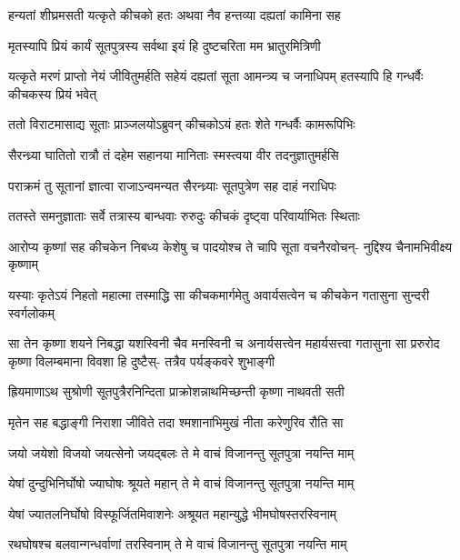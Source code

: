 \twolineshloka
{हन्यतां शीघ्रमसती यत्कृते कीचको हतः}
{अथवा नैव हन्तव्या दह्यतां कामिना सह}


\twolineshloka
{मृतस्यापि प्रियं कार्यं सूतपुत्रस्य सर्वथा}
{इयं हि दुष्टचरिता मम भ्रातुरमित्रिणी}


\threelineshloka
{यत्कृते मरणं प्राप्तो नेयं जीवितुमर्हति}
{सहेयं दह्यतां सूता आमन्त्र्य च जनाधिपम्}
{हतस्यापि हि गन्धर्वैः कीचकस्य प्रियं भवेत्}


\twolineshloka
{ततो विराटमासाद्य सूताः प्राञ्जलयोऽब्रुवन्}
{कीचकोऽयं हतः शेते गन्धर्वैः कामरूपिभिः}


\twolineshloka
{सैरन्ध्र्या घातितो रात्रौ तं दहेम सहानया}
{मानिताः स्मस्त्वया वीर तदनुज्ञातुमर्हसि}


\twolineshloka
{पराक्रमं तु सूतानां ज्ञात्वा राजाऽन्वमन्यत}
{सैरन्ध्र्याः सूतपुत्रेण सह दाहं नराधिपः}


\twolineshloka
{ततस्ते समनुज्ञाताः सर्वे तत्रास्य बान्धवाः}
{रुरुदुः कीचकं दृष्ट्वा परिवार्याभितः स्थिताः}


\fourlineindentedshloka
{आरोप्य कृष्णां सह कीचकेन}
{निबध्य केशेषु च पादयोश्च}
{ते चापि सूता वचनैरवोचन्-}
{नुद्दिश्य चैनामभिवीक्ष्य कृष्णाम्}


\fourlineindentedshloka
{यस्याः कृतेऽयं निहतो महात्मा}
{तस्माद्धि सा कीचकमार्गमेतु}
{अवार्यसत्वेन च कीचकेन}
{गतासुना सुन्दरी स्वर्गलोकम्}


\sixlineindentedshloka
{सा तेन कृष्णा शयने निबद्धा}
{यशस्विनी चैव मनस्विनी च}
{अनार्यसत्त्वेन महार्यसत्त्वा}
{गतासुना सा प्ररुरोद कृष्णा}
{विलम्बमाना विवशा हि दुष्टैस्-}
{तत्रैव पर्यङ्कवरे शुभाङ्गी}


\twolineshloka
{ह्रियमाणाऽथ सुश्रोणी सूतपुत्रैरनिन्दिता}
{प्राक्रोशन्नाथमिच्छन्ती कृष्णा नाथवती सती}


\twolineshloka
{मृतेन सह बद्धाङ्गी निराशा जीविते तदा}
{श्मशानाभिमुखं नीता करेणुरिव रौति सा}




\twolineshloka
{जयो जयेशो विजयो जयत्सेनो जयद्बलः}
{ते मे वाचं विजानन्तु सूतपुत्रा नयन्ति माम्}


\twolineshloka
{येषां दुन्दुभिनिर्घोषो ज्याघोषः श्रूयते महान्}
{ते मे वाचं विजानन्तु सूतपुत्रा नयन्ति माम्}


\twolineshloka
{येषां ज्यातलनिर्घोषो विस्फूर्जितमिवाशनेः}
{अश्रूयत महान्युद्धे भीमघोषस्तरस्विनाम्}


\twolineshloka
{रथघोषश्च बलवान्गन्धर्वाणां तरस्विनाम्}
{ते मे वाचं विजानन्तु सूतपुत्रा नयन्ति माम्}


